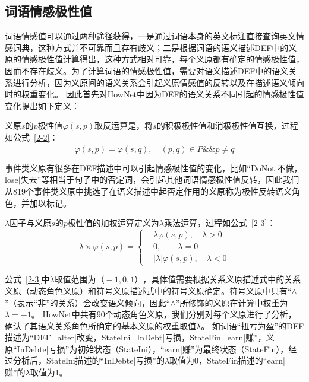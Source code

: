 \subsection{词语情感极性值}
词语情感值可以通过两种途径获得，一是通过词语本身的英文标注直接查询英文情感词典，这种方式并不可靠而且存有歧义；二是根据词语的语义描述DEF中的义原的情感极性值计算得出，这种方式相对可靠，每个义原都有确定的情感极性值，因而不存在歧义。为了计算词语的情感极性值，需要对语义描述DEF中的语义关系进行分析，因为义原间的语义关系会引起义原情感值的反转以及在描述语义倾向时的权重变化。
因此首先对HowNet中因为DEF的语义关系不同引起的情感极性值变化提出如下定义：
\begin{definition}[情感极性值反转]
义原$s$的$p$极性值$\varphi(s,p)$取反运算是，将$s$的积极极性值和消极极性值互换，过程如公式~\ref{2-2}：
\begin{equation}
\label{2-2}
\overline{\varphi(s,p)}=\varphi(s,q),\quad (p,q) \in P\&\& p \neq q
\end{equation}
\end{definition}
事件类义原有很多在DEF描述中可以引起情感极性值的变化，比如“DoNot$ | $不做，lose$ | $失去”等相当于句子中的否定词，会引起其他词语情感极性值反转，因此我们从819个事件类义原中挑选了在语义描述中起否定作用的义原称为极性反转语义角色，并加以标记。
\begin{definition}[情感极性值加权]
 $\lambda$因子与义原$s$的$p$极性值的加权运算定义为$\lambda$乘法运算，过程如公式~\ref{2-3}：
\begin{equation}
\label{2-3}
\lambda \times \varphi(s,p) =\begin{cases}
& \lambda \varphi(s,p), \quad  \lambda >0\\
& 0, \quad\quad  \lambda=0\\
&|\lambda|\varphi(s,p), \quad  \lambda <0
\end{cases}
\end{equation}
\end{definition}

公式~\ref{2-3}中$\lambda$取值范围为$ （-1,0,1） $，具体值需要根据关系义原描述式中的关系义原（动态角色义原）和符号义原描述式中的符号义原确定。符号义原中只有“$ \wedge$”（表示“非”的关系）会改变语义倾向，因此“$ \wedge$”所修饰的义原在计算中权重为$\lambda=-1$。
HowNet中共有90个动态角色义原，我们分别对每个义原进行了分析，确认了其语义关系角色所确定的基本义原的权重取值$\lambda$。
如词语“扭亏为盈”的DEF描述为“DEF=alter|改变，StateIni=InDebt|亏损，StateFin=earn|赚”，义原“InDebte|亏损”为初始状态（StateIni），“earn|赚”为最终状态（StateFin），经过分析后，StateIni描述的“InDebte|亏损”的$\lambda$取值为0，StateFin描述的“earn|赚”的$\lambda$取值为1。

